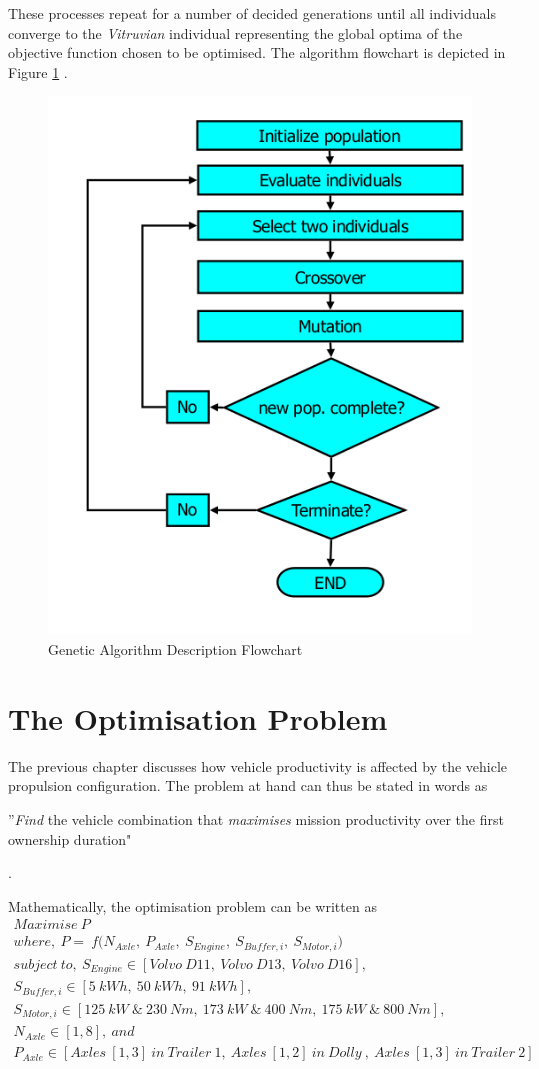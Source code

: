 \documentclass[ExampleMasters.tex]{subfiles}
\begin{document}
		These processes repeat for a number of decided generations until all individuals converge to the \textit{Vitruvian} individual representing the global optima of the objective function chosen to be optimised. The algorithm flowchart is depicted in Figure \ref{GAFlowchart} \cite{Wahde}.\\

		\begin{figure}[ht!]
			\centering
			\includegraphics[width=0.4\linewidth]{figures/GeneticAlgorithm/GAFlowchart.png}
			\caption{Genetic Algorithm Description Flowchart \cite{Wahde}}
			\label{GAFlowchart}
		\end{figure}

	\section{The Optimisation Problem}
		The previous chapter discusses how vehicle productivity is affected by the vehicle propulsion configuration. The problem at hand can thus be stated in words as\\
		
		\centerline{''\textit{Find} the vehicle combination that \textit{maximises} mission productivity over the first ownership duration"}. 

		Mathematically, the optimisation problem can be written as
		\begin{gather}
			\textit{Maximise}\  P\\
			where,\ P =\ f\Bigg(N_{Axle},\ P_{Axle},\ S_{Engine},\ S_{Buffer,i},\ S_{Motor,i}\Bigg)\\
			subject\ to,\ S_{Engine} \in {[Volvo\ D11,\ Volvo\ D13,\ Volvo\ D16]},\\
			S_{Buffer,i} \in {[5\ kWh,\ 50\ kWh,\ 91\ kWh]},\\
			S_{Motor,i} \in {[125\ kW\ \&\ 230\ Nm,\ 173\ kW\ \&\ 400\ Nm,\ 175\ kW\ \&\ 800\ Nm]},\\
			N_{Axle} \in {[1,8]},\ and\\
			P_{Axle} \in {[Axles\ [1,3]\ in\ Trailer\ 1,\ Axles\ [1,2]\ in\ Dolly\ ,\ Axles\ [1,3]\ in\ Trailer\ 2]}
		\end{gather}
\end{document}
